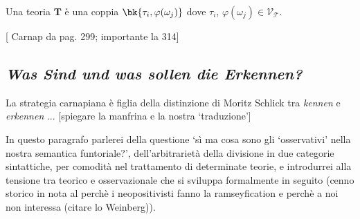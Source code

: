 \begin{definition} 
	Una teoria $\mathbf{T}$ è una coppia $\bk{\tau_i, \varphi (\omega_j)}$ dove $\tau_i$, $\varphi(\omega_j) \in \mathcal{V_T}$. 
\end{definition}



[\cite{} Carnap da pag. 299; importante la 314]

\subsection{\emph{Was Sind und was sollen die Erkennen?}}

La strategia carnapiana è figlia della distinzione di Moritz Schlick \cite{.} tra \emph{kennen} e \emph{erkennen} ... [spiegare la manfrina e la nostra `traduzione']

In questo paragrafo parlerei della questione `sì ma cosa sono gli `osservativi' nella nostra semantica funtoriale?', dell'arbitrarietà della divisione in due categorie sintattiche, per comodità nel trattamento di determinate teorie, e introdurrei alla tensione tra teorico e osservazionale che si sviluppa formalmente in seguito (cenno storico in nota al perchè i neopositivisti fanno la ramseyfication e perchè a noi non interessa (citare lo Weinberg)).  

